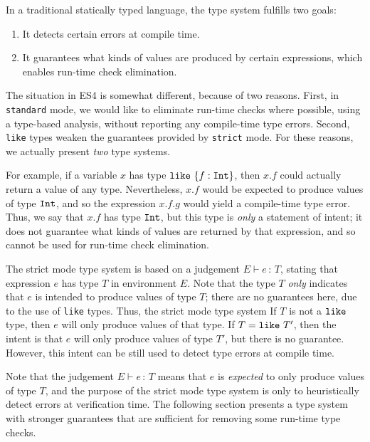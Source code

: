 \documentclass{article}
\newcommand{\judge}[2]{\ensuremath{\Gamma\vdash{#1}:{#2}}}
\newcommand{\Int}{\t{Int}}
\renewcommand{\t}[1]{{\tt #1}}
\renewcommand{\judge}[3]{#1\vdash #2\,:\,#3}
\newcommand{\objty}[1]{\{#1\}}
\newcommand{\objget}[2]{#1.#2}
\newcommand{\likety}[1]{\t{like}~#1}
\begin{document}
In a traditional statically typed language, the type system fulfills two goals: 
\begin{enumerate}
\item
It detects certain errors at compile time.
\item
It guarantees what kinds of values are produced by certain expressions, which enables  run-time check elimination.
\end{enumerate}

The situation in ES4 is somewhat different, because of two reasons. First, in \t{standard} mode, we would like to eliminate run-time checks where possible, using a type-based analysis,
without reporting any compile-time type errors.
Second, \t{like} types weaken the guarantees provided by \t{strict} mode.
For these reasons, we actually present \emph{two} type systems.

For example, if a variable $x$ has type $\likety{\objty{f:\Int}}$,
then $\objget x f$  could actually return a value of any type.  
Nevertheless, 
$\objget x f$
would be expected to produce values of type $\Int$, and so 
the expression
$\objget{\objget x f} g$ would yield a compile-time type error.
Thus, we say that $\objget x f$ has type $\Int$, but this type is \emph{only} a statement of intent;
it does not guarantee what kinds of values are returned by that expression,
and so cannot be used for run-time check elimination.



The strict mode type system is based on a judgement $\judge{E}{e}{T}$,
stating that expression $e$ has type $T$ in environment $E$.
Note that the type $T$ \emph{only} indicates that $e$ is intended to produce values of type $T$; there are no guarantees here, due to the use of \t{like} types. Thus, the strict mode type system 
If $T$ is not a $\likety{}$ type, then $e$ will only produce values of that type.
If $T=\likety{T'}$, then the intent is that $e$ will only produce values of type $T'$,
but there is no guarantee. However, this intent can be still used to detect type errors at compile time.

Note that the judgement $\judge{E}{e}{T}$ means that $e$ is \emph{expected} to only produce values of type $T$,
and the purpose of the strict mode type system is only to heuristically detect errors at verification time.
The following section presents a type system with stronger guarantees that are sufficient for removing some run-time type checks.
\end{document}
